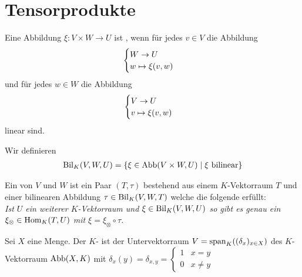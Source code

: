 \section{Tensorprodukte}

\begin{definition}
	Eine Abbildung $\xi:V\times W\to U$ ist , wenn für jedes $v\in V$ die Abbildung 
	\begin{align}
		\begin{cases}
		W\to U \\ w\mapsto \xi(v,w)
		\end{cases}\notag
	\end{align}
	und für jedes $w\in W$ die Abbildung
	\begin{align}
	\begin{cases}
	V\to U \\ v\mapsto \xi(v,w)
	\end{cases}\notag
	\end{align}
	linear sind.
	
	Wir definieren
	\begin{align}
		\operatorname{Bil}_K(V,W,U)=\{\xi\in\operatorname{Abb}(V\times W,U)\mid \xi\text{ bilinear}\}\notag
	\end{align}
\end{definition}

\begin{definition}[Tensorprodukt]
	Ein  von $V$ und $W$ ist ein Paar $(T,\tau)$ bestehend aus einem $K$-Vektorraum $T$ und einer bilinearen Abbildung $\tau\in\operatorname{Bil}_K(V,W,T)$ welche die folgende  erfüllt: \\
	\textit{Ist $U$ ein weiterer $K$-Vektorraum und $\xi\in\operatorname{Bil}_K(V,W,U)$ so gibt es genau ein $\xi_\otimes\in\operatorname{Hom}_K(T,U)$ mit $\xi=\xi_\otimes\circ\tau$.}
	\begin{center}
	\end{center}
\end{definition}

\begin{definition}
	Sei $X$ eine Menge. Der $K$- ist der Untervektorraum $V=\operatorname{span}_K((\delta_x)_{x\in X})$ des $K$-Vektorraum $\operatorname{Abb}(X,K)$ mit $\delta_x(y)=\delta_{x,y}=\begin{cases}1&x=y\\0&x\neq y\end{cases}$
\end{definition}
